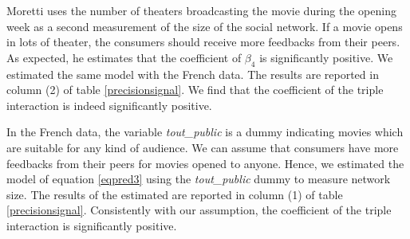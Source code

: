 Moretti uses the number of theaters broadcasting the movie during the opening week as a second measurement of the size of the social network.
If a movie opens in lots of theater, the consumers should receive more feedbacks from their peers.
As expected, he estimates that the coefficient of $\beta_4$ is significantly positive.
We estimated the same model with the French data.
The results are reported in column (2) of table \ref{precisionsignal}.
We find that the coefficient of the triple interaction is indeed significantly positive.

In the French data, the variable \textit{tout\_public} is a dummy indicating movies which are suitable for any kind of audience.
We can assume that consumers have more feedbacks from their peers for movies opened to anyone.
Hence, we estimated the model of equation \ref{eqpred3} using the \textit{tout\_public} dummy to measure network size.
The results of the estimated are reported in column (1) of table \ref{precisionsignal}.
Consistently with our assumption, the coefficient of the triple interaction is significantly positive.

